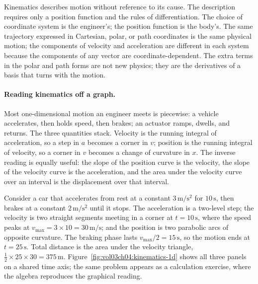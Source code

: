 

\begin{principle}
Kinematics describes motion without reference to its cause. The
description requires only a position function and the rules of
differentiation. The choice of coordinate system is the engineer's;
the position function is the body's. The same trajectory expressed
in Cartesian, polar, or path coordinates is the same physical motion;
the components of velocity and acceleration are different in each
system because the components of any vector are coordinate-dependent.
The extra terms in the polar and path forms are not new physics; they
are the derivatives of a basis that turns with the motion.
\end{principle}

\paragraph{Reading kinematics off a graph.} Most one-dimensional
motion an engineer meets is piecewise: a vehicle accelerates, then
holds speed, then brakes; an actuator ramps, dwells, and returns. The
three quantities stack. Velocity is the running integral of
acceleration, so a step in $a$ becomes a corner in $v$; position is
the running integral of velocity, so a corner in $v$ becomes a change
of curvature in $x$. The inverse reading is equally useful: the slope
of the position curve is the velocity, the slope of the velocity curve
is the acceleration, and the area under the velocity curve over an
interval is the displacement over that interval.

Consider a car that accelerates from rest at a constant
$3\,\si{\meter\per\second\squared}$ for $10\,\si{\second}$, then brakes
at a constant $2\,\si{\meter\per\second\squared}$ until it stops. The
acceleration is a two-level step; the velocity is two straight
segments meeting in a corner at $t=10\,\si{\second}$, where the speed
peaks at $v_{\max}=3\times 10=30\,\si{\meter\per\second}$; and the
position is two parabolic arcs of opposite curvature. The braking
phase lasts $v_{\max}/2=15\,\si{\second}$, so the motion ends at
$t=25\,\si{\second}$. Total distance is the area under the velocity
triangle, $\tfrac{1}{2}\times 25\times 30=375\,\si{\meter}$.
Figure~\ref{fig:vol03ch04:kinematics-1d} shows all three panels on a
shared time axis; the same problem appears as a calculation exercise,
where the algebra reproduces the graphical reading.


